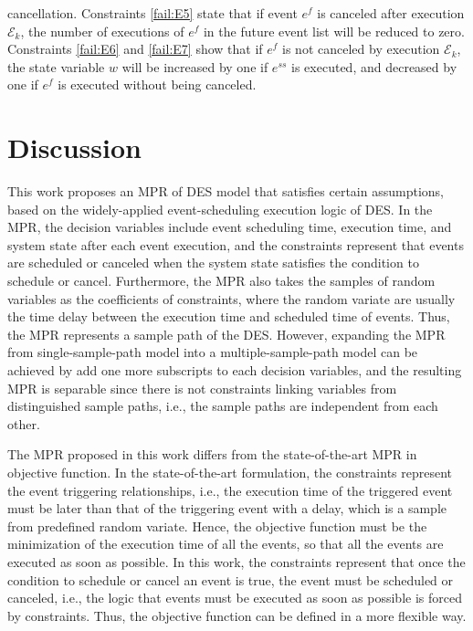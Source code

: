 \documentclass[]{interact}
\theoremstyle{plain}%
\theoremstyle{definition}
\theoremstyle{remark}
\begin{document}
cancellation. Constraints \eqref{fail:E5} state that if event $e^{f}$ is canceled after execution $\mathcal{E}_k$, the number of executions of $e^{f}$ in the future event list will be reduced to zero. Constraints \eqref{fail:E6} and \eqref{fail:E7} show that if $e^{f}$ is not canceled by execution $\mathcal{E}_k$, the state variable $w$ will be increased by one if $e^{ss}$ is executed, and decreased by one if $e^{f}$ is executed without being canceled.



\section{Discussion}\label{sec:discussion}

This work proposes an MPR of DES model that satisfies certain assumptions, based on the widely-applied event-scheduling execution logic of DES. In the MPR, the decision variables include event scheduling time, execution time, and system state after each event execution, and the constraints represent that events are scheduled or canceled when the system state satisfies the condition to schedule or cancel. Furthermore, the MPR also takes the samples of random variables as the coefficients of constraints, where the random variate are usually the time delay between the execution time and scheduled time of events. Thus, the MPR represents a sample path of the DES. However, expanding the MPR from single-sample-path model into a multiple-sample-path model can be achieved by add one more subscripts to each decision variables, and the resulting MPR is separable since there is not constraints linking variables from distinguished sample paths, i.e., the sample paths are independent from each other. 

The MPR proposed in this work differs from the state-of-the-art MPR \citep{chan2008optimization} in objective function. In the state-of-the-art formulation, the constraints represent the event triggering relationships, i.e., the execution time of the triggered event must be later than that of the triggering event with a delay, which is a sample from predefined random variate. Hence, the objective function must be the minimization of the execution time of all the events, so that all the events are executed as soon as possible. In this work, the constraints represent that once the condition to schedule or cancel an event is true, the event must be scheduled or canceled, i.e., the logic that events must be executed as soon as possible is forced by constraints. Thus, the objective function can be defined in a more flexible way. 
\end{document}
